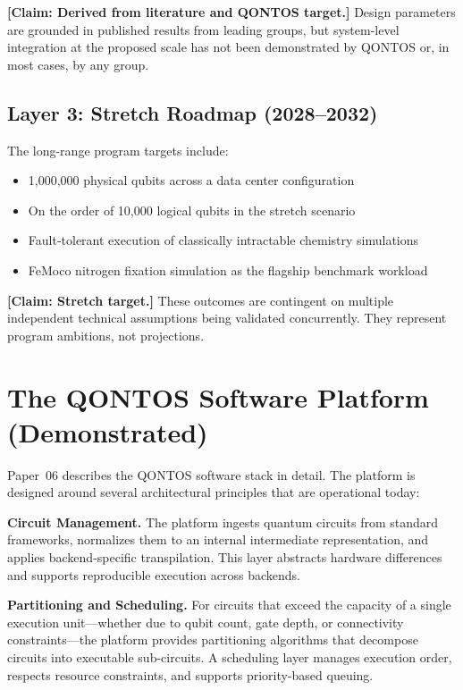 \documentclass[conference]{IEEEtran}
\begin{document}
\textbf{[Claim: Derived from literature and QONTOS target.]} Design parameters are grounded in published results from leading groups, but system-level integration at the proposed scale has not been demonstrated by QONTOS or, in most cases, by any group.

\subsection{Layer 3: Stretch Roadmap (2028--2032)}

The long-range program targets include:

\begin{itemize}
\item 1,000,000 physical qubits across a data center configuration
\item On the order of 10,000 logical qubits in the stretch scenario
\item Fault-tolerant execution of classically intractable chemistry simulations
\item FeMoco nitrogen fixation simulation as the flagship benchmark workload
\end{itemize}

\textbf{[Claim: Stretch target.]} These outcomes are contingent on multiple independent technical assumptions being validated concurrently. They represent program ambitions, not projections.

\section{The QONTOS Software Platform (Demonstrated)}

Paper~06 describes the QONTOS software stack in detail. The platform is designed around several architectural principles that are operational today:

\textbf{Circuit Management.} The platform ingests quantum circuits from standard frameworks, normalizes them to an internal intermediate representation, and applies backend-specific transpilation. This layer abstracts hardware differences and supports reproducible execution across backends.

\textbf{Partitioning and Scheduling.} For circuits that exceed the capacity of a single execution unit---whether due to qubit count, gate depth, or connectivity constraints---the platform provides partitioning algorithms that decompose circuits into executable sub-circuits. A scheduling layer manages execution order, respects resource constraints, and supports priority-based queuing.
\end{document}
